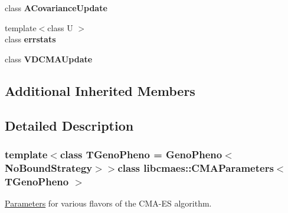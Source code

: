 \begin{DoxyCompactItemize}
\item 
\hypertarget{classlibcmaes_1_1CMAParameters_a81af003765a6521a192e5a37612c2fb5}{class {\bfseries A\+Covariance\+Update}}\label{classlibcmaes_1_1CMAParameters_a81af003765a6521a192e5a37612c2fb5}

\item 
\hypertarget{classlibcmaes_1_1CMAParameters_a867bde5f83097a4db1f667a3911efbae}{{\footnotesize template$<$class U $>$ }\\class {\bfseries errstats}}\label{classlibcmaes_1_1CMAParameters_a867bde5f83097a4db1f667a3911efbae}

\item 
\hypertarget{classlibcmaes_1_1CMAParameters_a3fceefe6a1e378ff9fef5d97117e5f47}{class {\bfseries V\+D\+C\+M\+A\+Update}}\label{classlibcmaes_1_1CMAParameters_a3fceefe6a1e378ff9fef5d97117e5f47}

\end{DoxyCompactItemize}
\subsection*{Additional Inherited Members}


\subsection{Detailed Description}
\subsubsection*{template$<$class T\+Geno\+Pheno = Geno\+Pheno$<$\+No\+Bound\+Strategy$>$$>$class libcmaes\+::\+C\+M\+A\+Parameters$<$ T\+Geno\+Pheno $>$}

\hyperlink{classlibcmaes_1_1Parameters}{Parameters} for various flavors of the C\+M\+A-\/\+E\+S algorithm. 

